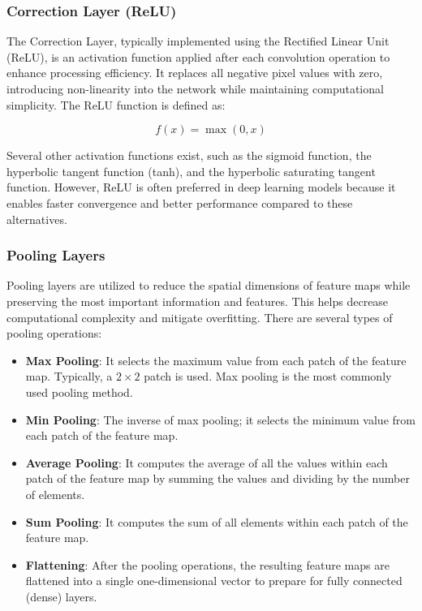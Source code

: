 \subsubsection{Correction Layer (ReLU)}

The Correction Layer, typically implemented using the Rectified Linear Unit (ReLU), is an activation function applied after each convolution operation to enhance processing efficiency. It replaces all negative pixel values with zero, introducing non-linearity into the network while maintaining computational simplicity. The ReLU function is defined as:

\begin{equation}
  f(x) = \max(0, x)
\end{equation}

Several other activation functions exist, such as the sigmoid function, the hyperbolic tangent function (tanh), and the hyperbolic saturating tangent function. However, ReLU is often preferred in deep learning models because it enables faster convergence and better performance compared to these alternatives.

\subsubsection{Pooling Layers}

Pooling layers are utilized to reduce the spatial dimensions of feature maps while preserving the most important information and features. This helps decrease computational complexity and mitigate overfitting. There are several types of pooling operations:

\begin{itemize}
  \item \textbf{Max Pooling}:
        It selects the maximum value from each patch of the feature map. Typically, a $2 \times 2$ patch is used. Max pooling is the most commonly used pooling method.

  \item \textbf{Min Pooling}:
        The inverse of max pooling; it selects the minimum value from each patch of the feature map.

  \item \textbf{Average Pooling}:
        It computes the average of all the values within each patch of the feature map by summing the values and dividing by the number of elements.

  \item \textbf{Sum Pooling}:
        It computes the sum of all elements within each patch of the feature map.

  \item \textbf{Flattening}:
        After the pooling operations, the resulting feature maps are flattened into a single one-dimensional vector to prepare for fully connected (dense) layers.
\end{itemize}

